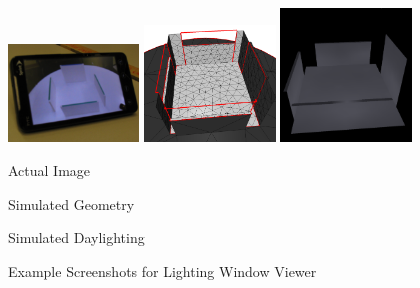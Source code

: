 \begin{figure}[t]
\includegraphics[width=0.31\textwidth]{images/IMG_1380.png}
\includegraphics[width=0.31\textwidth]{images/remesher_screenshot.png}
\includegraphics[width=0.31\textwidth]{images/lsv_screenshot.png}
\vspace{0.1in}\\
\begin{minipage}{0.31\textwidth}\vspace{-0.25in} \begin{center} Actual Image \end{center}\end{minipage}%
\begin{minipage}{0.31\textwidth}\vspace{-0.25in} \begin{center} Simulated Geometry \end{center}\end{minipage}%
\begin{minipage}{0.31\textwidth}\vspace{-0.25in} \begin{center} Simulated Daylighting \end{center}\end{minipage}%
\vspace{-0.25in}

\caption{Example Screenshots for Lighting Window Viewer}
\end{figure}


